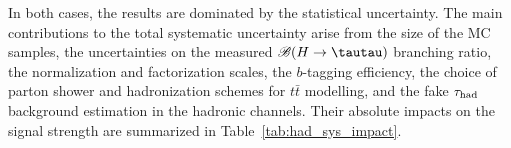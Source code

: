In both cases, the results are dominated by the statistical uncertainty.
The main contributions to the total systematic uncertainty arise from  the size of the MC samples,
the uncertainties on the measured $\BR(H\to \tautau)$ branching ratio,
the normalization and factorization scales, the $b$-tagging efficiency, the choice of parton shower and hadronization schemes for $t\bar t$ modelling, and
the fake $\tau_{\mathrm{had}}$ background estimation in the hadronic channels. Their absolute impacts on the signal strength are summarized in Table~\ref{tab:had_sys_impact}.
